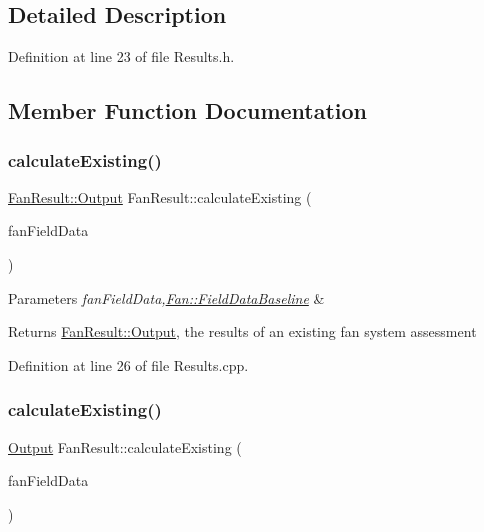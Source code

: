 \subsection{Detailed Description}


Definition at line 23 of file Results.\+h.



\subsection{Member Function Documentation}
\mbox{\label{class_fan_result_ad9bd0cc8f62fcb7bb7aca7eea511a2f3}} 
\subsubsection{\texorpdfstring{calculate\+Existing()}{calculateExisting()}\hspace{0.1cm}{\footnotesize\ttfamily [1/3]}}
{\footnotesize\ttfamily \hyperlink{struct_fan_result_1_1_output}{Fan\+Result\+::\+Output} Fan\+Result\+::calculate\+Existing (\begin{DoxyParamCaption}\item[{\hyperlink{struct_fan_1_1_field_data_baseline}{Fan\+::\+Field\+Data\+Baseline} const \&}]{fan\+Field\+Data }\end{DoxyParamCaption})}


\begin{DoxyParams}{Parameters}
{\em fan\+Field\+Data,\hyperlink{struct_fan_1_1_field_data_baseline}{Fan\+::\+Field\+Data\+Baseline}} & \\
\hline
\end{DoxyParams}
\begin{DoxyReturn}{Returns}
\hyperlink{struct_fan_result_1_1_output}{Fan\+Result\+::\+Output}, the results of an existing fan system assessment 
\end{DoxyReturn}


Definition at line 26 of file Results.\+cpp.

\mbox{\label{class_fan_result_abc80cb0fb339969c2497786e479d9484}} 
\subsubsection{\texorpdfstring{calculate\+Existing()}{calculateExisting()}\hspace{0.1cm}{\footnotesize\ttfamily [2/3]}}
{\footnotesize\ttfamily \hyperlink{struct_fan_result_1_1_output}{Output} Fan\+Result\+::calculate\+Existing (\begin{DoxyParamCaption}\item[{\hyperlink{struct_fan_1_1_field_data_baseline}{Fan\+::\+Field\+Data\+Baseline} const \&}]{fan\+Field\+Data }\end{DoxyParamCaption})}


